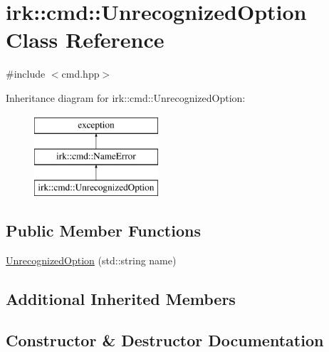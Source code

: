 \hypertarget{classirk_1_1cmd_1_1UnrecognizedOption}{}\section{irk\+:\+:cmd\+:\+:Unrecognized\+Option Class Reference}
\label{classirk_1_1cmd_1_1UnrecognizedOption}


{\ttfamily \#include $<$cmd.\+hpp$>$}

Inheritance diagram for irk\+:\+:cmd\+:\+:Unrecognized\+Option\+:\begin{figure}[H]
\begin{center}
\leavevmode
\includegraphics[height=3.000000cm]{classirk_1_1cmd_1_1UnrecognizedOption}
\end{center}
\end{figure}
\subsection*{Public Member Functions}
\begin{DoxyCompactItemize}
\item 
\mbox{\hyperlink{classirk_1_1cmd_1_1UnrecognizedOption_aa77ff7549039d9508f5d097410ea89ed}{Unrecognized\+Option}} (std\+::string name)
\end{DoxyCompactItemize}
\subsection*{Additional Inherited Members}


\subsection{Constructor \& Destructor Documentation}
\mbox{\label{classirk_1_1cmd_1_1UnrecognizedOption_aa77ff7549039d9508f5d097410ea89ed}} 
